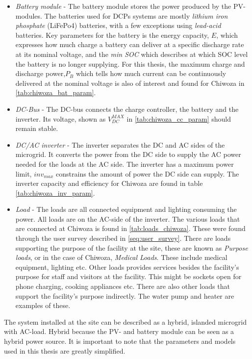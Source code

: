 \begin{itemize}
    \item \textit{Battery module}   -   The battery module stores the power produced by the PV-modules. The batteries used for DCPs systems are mostly \textit{lithium iron phosphate} (LiFePo4) batteries, with a few exceptions using \textit{lead-acid} batteries. Key parameters for the battery is the energy capacity, $E$, which expresses how much charge a battery can deliver at a specific discharge rate at its nominal voltage, and the \textit{min SOC} which describes at which SOC level the battery is no longer supplying. For this thesis, the maximum charge and discharge power,$P_B$ which tells how much current can be continuously delivered at the nominal voltage is also of interest and found for Chiwoza in \autoref{tab:chiwoza_bat_param}.  
    
    \item \textit{DC-Bus}   -   The DC-bus connects the charge controller, the battery and the inverter. Its voltage, shown as $V^{MAX}_{DC}$ in \autoref{tab:chiwoza_cc_param} should remain stable.
    
    \item \textit{DC/AC inverter}   -   The inverter separates the DC and AC sides of the microgrid. It converts the power from the DC side to supply the AC power needed for the loads at the AC side. The inverter has a maximum power limit, $inv_{max}$ constrains the amount of power the DC side can supply. The inverter capacity and efficiency for Chiwoza are found in table \ref{tab:chiwoza_inv_param}. 
    
    \item \textit{Load}   -   The loads are all connected equipment and lighting consuming the power. All loads are on the AC-side of the inverter. The various loads that are connected at Chiwoza is found in \autoref{tab:loads_chiwoza}. These were found through the user survey described in \autoref{seq:user_survey}. There are loads supporting the purpose of the facility at the site, these are known as \textit{Purpose loads}, or in the case of Chiwoza, \textit{Medical Loads}. These include medical equipment, lighting etc. Other loads provides services besides the facility's purpose for staff and visitors at the facility. This might be sockets open for phone charging, cooking appliances etc. There are also other loads that support the facility's purpose indirectly. The water pump and heater are examples of these. 
\end{itemize}
The system installed at the site can be described as a hybrid, islanded microgrid with AC-load. Hybrid because the PV- and battery module can be seen as a hybrid power source. It is important to note that the parameters and models used in this thesis are greatly simplified. 



